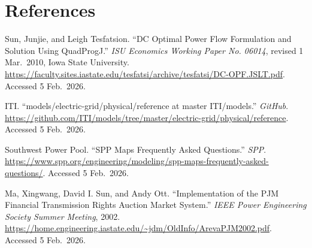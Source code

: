 \documentclass[11pt]{article}
\begin{document}
\newpage
\section{References}
\noindent
Sun, Junjie, and Leigh Tesfatsion. ``DC Optimal Power Flow Formulation and Solution Using QuadProgJ.'' \textit{ISU Economics Working Paper No. 06014}, revised 1 Mar.\ 2010, Iowa State University. \url{https://faculty.sites.iastate.edu/tesfatsi/archive/tesfatsi/DC-OPF.JSLT.pdf}. Accessed 5 Feb.\ 2026.

\noindent
ITI. ``models/electric-grid/physical/reference at master \textperiodcentered{} ITI/models.'' \textit{GitHub}. \url{https://github.com/ITI/models/tree/master/electric-grid/physical/reference}. Accessed 5 Feb.\ 2026.

\noindent
Southwest Power Pool. ``SPP Maps Frequently Asked Questions.'' \textit{SPP}. \url{https://www.spp.org/engineering/modeling/spp-maps-frequently-asked-questions/}. Accessed 5 Feb.\ 2026.

\noindent
Ma, Xingwang, David I. Sun, and Andy Ott. ``Implementation of the PJM Financial Transmission Rights Auction Market System.'' \textit{IEEE Power Engineering Society Summer Meeting}, 2002. \url{https://home.engineering.iastate.edu/~jdm/OldInfo/ArevaPJM2002.pdf}. Accessed 5 Feb.\ 2026.
\end{document}
